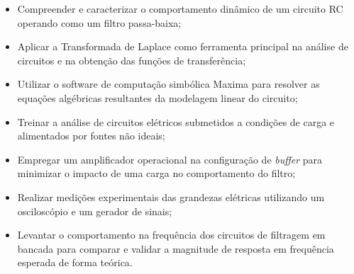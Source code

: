 \begin{itemize}
	\item Compreender e caracterizar o comportamento dinâmico de um circuito RC operando como um filtro passa-baixa;
	\item Aplicar a Transformada de Laplace como ferramenta principal na análise de circuitos e na obtenção das funções de transferência;
	\item Utilizar o software de computação simbólica Maxima \cite{maxima} para resolver as equações algébricas resultantes da modelagem linear do circuito;
	\item Treinar a análise de circuitos elétricos submetidos a condições de carga e alimentados por fontes não ideais;
	\item Empregar um amplificador operacional na configuração de \textit{buffer} para minimizar o impacto de uma carga no comportamento do filtro;
	\item Realizar medições experimentais das grandezas elétricas utilizando um osciloscópio e um gerador de sinais;
	\item Levantar o comportamento na frequência dos circuitos de filtragem em bancada para comparar e validar a magnitude de resposta em frequência esperada de forma teórica.
\end{itemize}